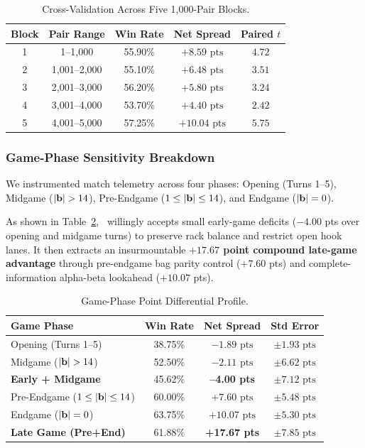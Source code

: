 \begin{table}[!htbp]
\centering
\small
\caption{Cross-Validation Across Five 1,000-Pair Blocks.}
\label{tab:block_consistency}
\begin{tabular}{ccccc}
\toprule
\textbf{Block} & \textbf{Pair Range} & \textbf{Win Rate} & \textbf{Net Spread} & \textbf{Paired $t$} \\
\midrule
1 & 1--1,000 & 55.90\% & $+8.59\text{ pts}$ & $4.72$ \\
2 & 1,001--2,000 & 55.10\% & $+6.48\text{ pts}$ & $3.51$ \\
3 & 2,001--3,000 & 56.20\% & $+5.80\text{ pts}$ & $3.24$ \\
4 & 3,001--4,000 & 53.70\% & $+4.40\text{ pts}$ & $2.42$ \\
5 & 4,001--5,000 & 57.25\% & $+10.04\text{ pts}$ & $5.75$ \\
\bottomrule
\end{tabular}
\end{table}

\subsubsection{Game-Phase Sensitivity Breakdown}

We instrumented match telemetry across four phases: Opening (Turns 1--5), Midgame ($|\mathbf{b}| > 14$), Pre-Endgame ($1 \le |\mathbf{b}| \le 14$), and Endgame ($|\mathbf{b}| = 0$).

As shown in Table~\ref{tab:phase_breakdown}, \algo\ willingly accepts small early-game deficits ($-4.00$ pts over opening and midgame turns) to preserve rack balance and restrict open hook lanes. It then extracts an insurmountable \textbf{$+17.67$ point compound late-game advantage} through pre-endgame bag parity control ($+7.60$ pts) and complete-information alpha-beta lookahead ($+10.07$ pts).

\begin{table}[!htbp]
\centering
\small
\caption{Game-Phase Point Differential Profile.}
\label{tab:phase_breakdown}
\begin{tabular}{lccc}
\toprule
\textbf{Game Phase} & \textbf{Win Rate} & \textbf{Net Spread} & \textbf{Std Error} \\
\midrule
Opening (Turns 1--5) & 38.75\% & $-1.89\text{ pts}$ & $\pm 1.93\text{ pts}$ \\
Midgame ($|\mathbf{b}| > 14$) & 52.50\% & $-2.11\text{ pts}$ & $\pm 6.62\text{ pts}$ \\
\midrule
\textbf{Early + Midgame} & 45.62\% & \textbf{--4.00 pts} & $\pm 7.12\text{ pts}$ \\
\midrule
Pre-Endgame ($1 \le |\mathbf{b}| \le 14$) & 60.00\% & $+7.60\text{ pts}$ & $\pm 5.48\text{ pts}$ \\
Endgame ($|\mathbf{b}| = 0$) & 63.75\% & $+10.07\text{ pts}$ & $\pm 5.30\text{ pts}$ \\
\midrule
\textbf{Late Game (Pre+End)} & 61.88\% & \textbf{+17.67 pts} & $\pm 7.85\text{ pts}$ \\
\bottomrule
\end{tabular}
\end{table}


